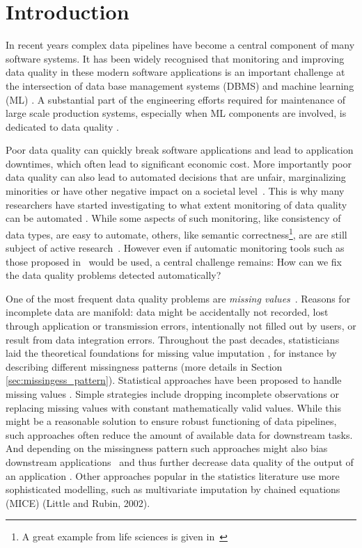 \section{Introduction}
\label{sec:introduction}

In recent years complex data pipelines have become a central component of many software systems. It has been widely recognised that monitoring and improving data quality in these modern software applications is an important challenge at the intersection of data base management systems (DBMS) and machine learning (ML) \citep{Schelter2015,Abedjan2018}. A substantial part of the engineering efforts required for maintenance of large scale production systems, especially when ML components are involved, is dedicated to data quality \citep{Sculley2015,Bose2017b}. 

Poor data quality can quickly break software applications and lead to application downtimes, which often lead to significant economic cost. More importantly poor data quality can also lead to automated decisions that are unfair, marginalizing minorities or have other negative impact on a societal level~\citep{Stoyanovich2020,Yang2020,Bender2021}. This is why many researchers have started investigating to what extent monitoring of data quality can be automated \citep{Abedjan2016,Baylor2017,Schelter2018,rukat2020towards}. While some aspects of such monitoring, like consistency of data types, are easy to automate, others, like semantic correctness\footnote{A great example from life sciences is given in~\citep{Ziemann2016}}, are are still subject of active research~\citep{biessmann2021automated}. However even if automatic monitoring tools such as those proposed in~\citep{Schelter2017} would be used, a central challenge remains: How can we fix the data quality problems detected automatically?

One of the most frequent data quality problems are \emph{missing values}~\citep{Kumar}. Reasons for incomplete data are manifold: data might be accidentally not recorded, lost through application or transmission errors, intentionally not filled out by users, or result from data integration errors.
%
Throughout the past decades, statisticians laid the theoretical foundations for missing value imputation \citep{Rubin}, for instance by describing different missingness patterns (more details in Section \ref{sec:missingess_pattern}). Statistical approaches have been proposed to handle missing values \citep{Graham}. Simple strategies include dropping incomplete observations or replacing missing values with constant mathematically valid values. While this might be a reasonable solution to ensure robust functioning of data pipelines, such approaches often reduce the amount of available data for downstream tasks. And depending on the missingness pattern such approaches might also bias downstream applications~\citep{Stoyanovich2020,Yang2020} and thus further decrease data quality of the output of an application \citep{Little, Graham}. Other approaches popular in the statistics literature use more sophisticated modelling, such as multivariate imputation by chained equations (MICE) (Little and Rubin, 2002).


